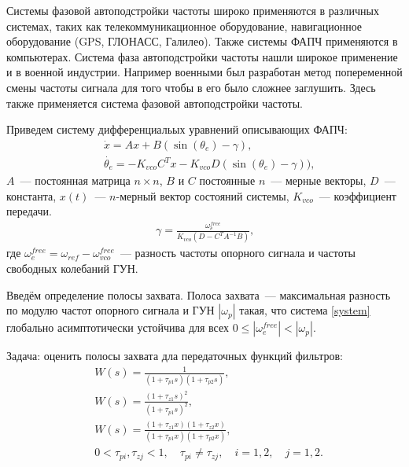 \documentclass[a4paper,article,14pt]{extarticle}
\begin{document}
  Системы фазовой автоподстройки частоты широко применяются в различных системах, таких как телекоммуникационное оборудование, навигационное оборудование (GPS, ГЛОНАСС, Галилео). Также системы ФАПЧ применяются в компьютерах. Система фаза автоподстройки частоты нашли широкое применение и в военной индустрии. Например военными был разработан метод попеременной смены частоты сигнала для того чтобы в его было сложнее заглушить. Здесь также применяется система фазовой автоподстройки частоты.
    
Приведем систему дифференциальых уравнений описывающих ФАПЧ: 
    \begin{equation}\label{system}
 \begin{aligned}
 &\dot{x} = Ax + B(\operatorname{sin}(\theta_e) - \gamma)\text{,}\\[0.3pt]
 &\dot{\theta_e} = -K_{vco}C^T x -K_{vco}D(\operatorname{sin}(\theta_e) - \gamma))\text{,}
 \end{aligned}
\end{equation}
$A$~--- постоянная матрица $n \times n$, $B$ и $C$ постоянные $n$~--- мерные векторы, $D$~--- константа, $x(t)$~--- $n$-мерный вектор состояний системы, $K_{vco}$~--- коэффициент передачи.\vspace{-1mm}
 \begin{equation}\label{gamma}
 \begin{aligned}
\gamma = \frac{\omega_e^{free}}{K_{vco}\left(D-C^T A^{-1}B\right)}\text{,}
 \end{aligned}
\end{equation}
где $\omega^{free}_{e}=\omega_{ref}-\omega_{vco}^{free}$~--- разность частоты опорного сигнала и частоты свободных колебаний ГУН.
    
    Введём определение полосы захвата. Полоса захвата~--- максимальная разность по модулю частот опорного сигнала и ГУН $|\omega_p|$ такая, что система \eqref{system} глобально асимптотически устойчива для всех $0 \leqslant |\omega_e^{free}|<|\omega_p|$. 
    
Задача: оценить полосы захвата дла передаточных функций фильтров:
 \begin{align*}
&W(s) = \frac{1}{(1+\tau_{p1}s)(1+\tau_{p2}s)},\\[5pt]
&W(s) = \frac{(1+\tau_{z1}s)^2}{(1+\tau_{p1}s)^2},\\[5pt]
&W(s) = \frac{(1+\tau_{z1}x)(1+\tau_{z2}x)}{(1+\tau_{p1}x)(1+\tau_{p2}x)},\\
&0<\tau_{pi},\tau_{zj} < 1, \quad \tau_{pi} \neq \tau_{zj}, \quad i=1,2, \quad j=1,2.
 \end{align*}
    
\end{document}

